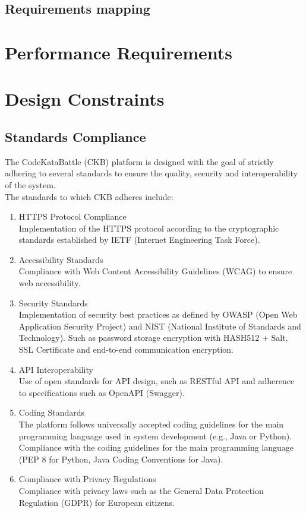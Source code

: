 \subsection{Requirements mapping}
\section{Performance Requirements}

\section{Design Constraints}
\subsection{Standards Compliance}
The CodeKataBattle (CKB) platform is designed with the goal of strictly adhering to several standards to ensure the quality, security and interoperability of the system.\\ The standards to which CKB adheres include:

\begin{enumerate}
      \item HTTPS Protocol Compliance\\
            Implementation of the HTTPS protocol according to the cryptographic standards established by IETF (Internet Engineering Task Force).

      \item Accessibility Standards\\
            Compliance with Web Content Accessibility Guidelines (WCAG) to ensure web accessibility.

      \item Security Standards\\
            Implementation of security best practices as defined by OWASP (Open Web Application Security Project) and NIST (National Institute of Standards and Technology).
            Such as password storage encryption with HASH512 + Salt, SSL Certificate and end-to-end communication encryption.


      \item API Interoperability\\
            Use of open standards for API design, such as RESTful API and adherence to specifications such as OpenAPI (Swagger).


      \item Coding Standards\\
            The platform follows universally accepted coding guidelines for the main programming language used in system development (e.g., Java or Python).
            Compliance with the coding guidelines for the main programming language (PEP 8 for Python, Java Coding Conventions for Java).


      \item Compliance with Privacy Regulations\\
            Compliance with privacy laws such as the General Data Protection Regulation (GDPR) for European citizens.
\end{enumerate}

